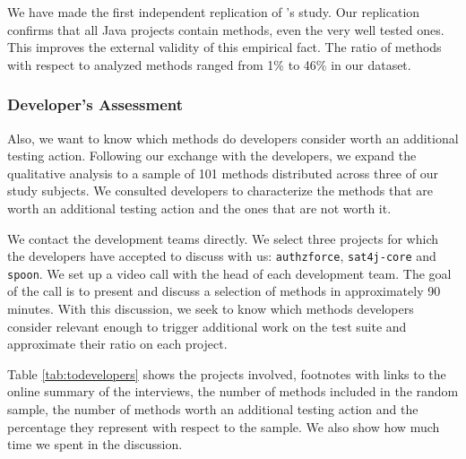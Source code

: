 We have made the first independent replication of \theoriginalauthors's study. 
Our replication confirms that all Java projects contain \pseudotested{} methods, even the very well tested ones. 
This improves the external validity of this empirical fact. 
The ratio of \pseudotested{} methods with respect to analyzed methods ranged from 1\% to 46\% in our dataset.

\subsubsection{Developer's Assessment}
\label{subsubsec:transversal-contributions:descartes:evaluation:developer}

Also, we want to know which \pseudotested{} methods do developers consider worth an additional testing action.
Following our exchange with the developers, we expand the qualitative analysis to a sample of 101 \pseudotested{} methods distributed across three of our study subjects. 
We consulted developers to characterize the \pseudotested{} methods that are worth an additional testing action and the ones that are not worth it.

We contact the development teams directly. 
We select three projects for which  the developers have accepted to discuss with us: \texttt{authzforce}, \texttt{sat4j-core} and \texttt{spoon}. 
We set up a video call with the head of each development team. 
The goal of the call is to present and discuss a selection of \pseudotested{} methods in approximately 90 minutes. 
With this discussion, we seek to know which \pseudotested{} methods developers consider relevant enough to trigger additional work on the test suite and approximate their ratio on each project.

Table \ref{tab:todevelopers} shows the projects involved, footnotes with links to the online summary of the interviews, the number of \pseudotested{} methods included in the random sample, the number of methods worth an additional testing action and the percentage they represent with respect to the sample. We also show how much time we spent in the discussion.

